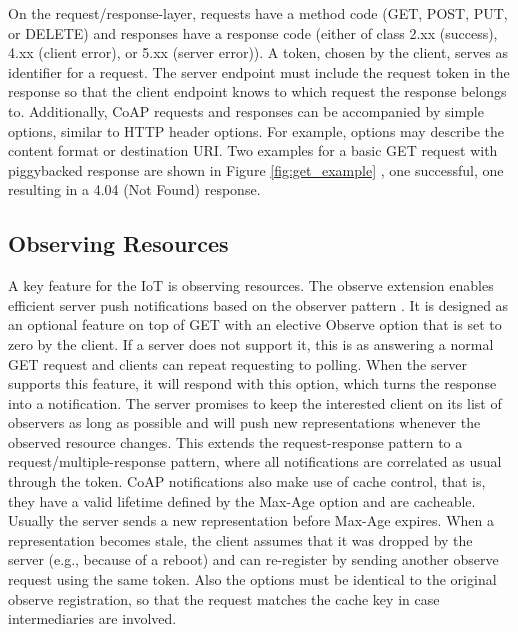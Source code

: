 On the request/response-layer, requests have a method code (GET, POST, PUT, or DELETE) and responses have a response code (either of class 2.xx (success), 4.xx (client error), or 5.xx (server error)). A token, chosen by the client, serves as identifier for a request. The server endpoint must include the request token in the response so that the client endpoint knows to which request the response belongs to. Additionally, CoAP requests and responses can be accompanied by simple options, similar to HTTP header options. For example, options may describe the content format or destination URI. Two examples for a basic GET request with piggybacked response are shown in Figure \ref{fig:get_example} \cite{coap_protocol}, one successful, one resulting in a 4.04 (Not Found) response.

\subsection{Observing Resources}\label{observe_resource}

A key feature for the IoT is observing resources. The observe extension enables efficient server push notifications based on the observer pattern \cite{kovatsch2015scalable}. It is designed as an optional feature on top of GET with an elective Observe option that is set to zero by the client. If a server does not support it, this is as answering a normal GET request and clients can repeat requesting to polling. When the server supports this feature, it will respond with this option, which turns the response into a notification. The server promises to keep the interested client on its list of observers as long as possible and will push new representations whenever the observed resource changes. This extends the request-response pattern to a request/multiple-response pattern, where all notifications are correlated as usual through the token. CoAP notifications also make use of cache control, that is, they have a valid lifetime defined by the Max-Age option and are cacheable. Usually the server sends a new representation before Max-Age expires. When a representation becomes stale, the client assumes that it was dropped by the server (e.g., because of a reboot) and can re-register by sending another observe request using the same token. Also the options must be identical to the original observe registration, so that the request matches the cache key in case intermediaries are involved.

